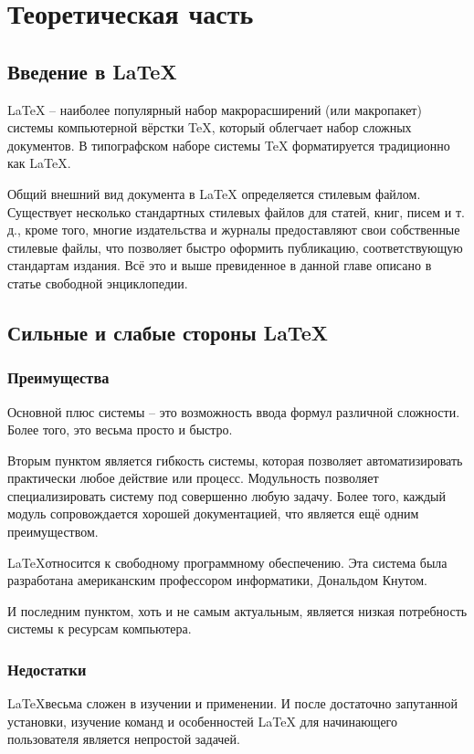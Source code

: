 \section{ Теоретическая часть}
	\subsection{Введение в \LaTeX}
		LaTeX -- наиболее популярный набор макрорасширений (или макропакет) системы компьютерной вёрстки TeX,
		который облегчает набор сложных документов. В типографском наборе системы TeX форматируется традиционно как \LaTeX .

		Общий внешний вид документа в LaTeX определяется стилевым файлом. Существует несколько стандартных стилевых файлов для статей,
		книг, писем и т. д., кроме того, многие издательства и журналы предоставляют свои собственные стилевые файлы,
		что позволяет быстро оформить публикацию, соответствующую стандартам издания. Всё это и выше превиденное в данной главе
		описано в статье свободной энциклопедии.

	\subsection{Сильные и слабые стороны \LaTeX}
		\subsubsection*{Преимущества}
			Основной плюс системы -- это возможность ввода формул различной сложности. Более того, это весьма просто и быстро.

			Вторым пунктом является гибкость системы, которая позволяет автоматизировать практически любое действие или процесс.
			Модульность позволяет специализировать систему под совершенно любую задачу. Более того, каждый модуль сопровождается хорошей документацией, что является ещё одним преимуществом. 

			\LaTeX относится к свободному программному обеспечению. Эта система была разработана американским профессором информатики, Дональдом Кнутом.

			И последним пунктом, хоть и не самым актуальным, является низкая потребность системы к ресурсам компьютера.

		\subsubsection*{Недостатки}
			\LaTeX весьма сложен в изучении и применении. И после достаточно запутанной установки, изучение команд и особенностей \LaTeX
			для начинающего пользователя является непростой задачей.

